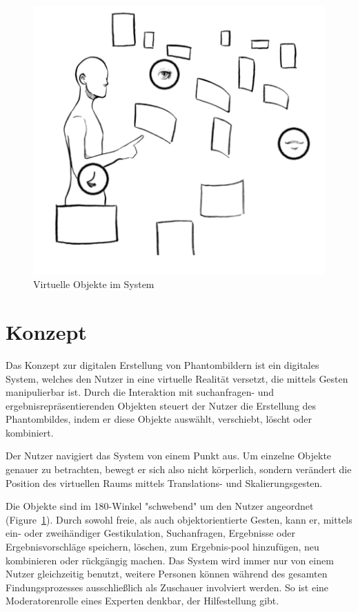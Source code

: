 \documentclass{sigchi-ext}
\begin{document}
\begin{figure}
  \centering
  \includegraphics[width=1\marginparwidth]{figures/system_overview}
  \caption{Virtuelle Objekte im System}
  \label{fig:systemoverview}
\end{figure}

\section{Konzept}

Das Konzept zur digitalen Erstellung von Phantombildern ist ein digitales System, welches den Nutzer in eine virtuelle Realität versetzt, die mittels Gesten manipulierbar ist. Durch die Interaktion mit suchanfragen- und ergebnisrepräsentierenden Objekten steuert der Nutzer die Erstellung des Phantombildes, indem er diese Objekte auswählt, verschiebt, löscht oder kombiniert. 

Der Nutzer navigiert das System von einem Punkt aus. Um einzelne Objekte genauer zu betrachten, bewegt er sich also nicht körperlich, sondern verändert die Position des virtuellen Raums mittels Translations- und Skalierungsgesten.

Die Objekte sind im 180-Winkel "schwebend" um den Nutzer angeordnet (Figure~\ref{fig:systemoverview}). Durch sowohl freie, als auch objektorientierte Gesten, kann er, mittels ein- oder zweihändiger Gestikulation, Suchanfragen, Ergebnisse oder Ergebnisvorschläge speichern, löschen, zum Ergebnis-pool hinzufügen, neu kombinieren oder rückgängig machen.
Das System wird immer nur von einem Nutzer gleichzeitig benutzt,
weitere Personen können während des gesamten Findungsprozesses
ausschließlich als Zuschauer involviert werden. So ist eine
Moderatorenrolle eines Experten denkbar, der Hilfestellung gibt.
\end{document}
